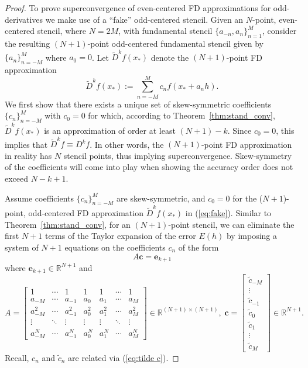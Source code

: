 \documentclass[10pt,a4paper]{amsart}
\newcommand{\FD}{D}
\newcommand{\xstar}{x_*}
\begin{document}
\begin{proof}  
To prove superconvergence of even-centered FD approximations for odd-derivatives we make use of a ``fake'' odd-centered stencil.
Given an $N$-point, even-centered stencil, where $N=2M$, with fundamental stencil $\{a_{-n},a_n\}_{n=1}^M$, consider the resulting $(N+1)$-point odd-centered fundamental stencil given by $\{a_n\}_{n=-M}^M$ where $a_0=0$.
Let $\tilde \FD^k f(\xstar)$ denote the $(N+1)$-point FD approximation
\begin{equation}\label{eq:fake}
	\tilde\FD^k f(\xstar) := \sum_{n=-M}^M c_nf(\xstar+a_nh).
\end{equation}
We first show that there exists a unique set of skew-symmetric coefficients $\{c_n\}_{n=-M}^M$ with $c_0=0$ for which, according to Theorem~\ref{thm:stand_conv}, $\tilde\FD^k f(\xstar)$ is an approximation of order at least $(N+1)-k$.
Since $c_0=0$, this implies that $\tilde \FD^k f\equiv D^kf$.
In other words, the $(N+1)$-point FD approximation in reality has $N$ stencil points, thus implying superconvergence.
Skew-symmetry of the coefficients will come into play when showing the accuracy order does not exceed $N-k+1$.

Assume coefficients $\{c_n\}_{n=-M}^M$ are skew-symmetric, and $c_0=0$ for the ($N+1$)-point, odd-centered FD approximation $\tilde\FD^kf(\xstar)$ in (\ref{eq:fake}).
Similar to Theorem~\ref{thm:stand_conv}, for an $(N+1)$-point stencil, we can eliminate the first $N+1$ terms of the Taylor expansion of the error $E(h)$ by imposing a system of $N+1$ equations on the coefficients $c_n$ of the form
\begin{equation}\label{eq:big}
	A\mathbf c = \mathbf e_{k+1}
\end{equation}
where $\mathbf e_{k+1}\in \mathbb R^{N+1}$ and
\begin{equation}\label{eq:MatAOE}
	A =
	\begin{bmatrix}
		1 &\cdots & 1 &1 & 1 & \cdots & 1\\
		a_{-M}& \cdots& a_{-1}& a_0 & a_1 & \cdots & a_M\\
		a_{-M}^2& \cdots& a_{-1}^2& a_0^2 & a_1^2 & \cdots & a_M^2\\
		\vdots & \ddots & \vdots & \vdots & \vdots & \ddots & \vdots\\
		a_{-M}^{N}&\cdots & a_{-1}^{N}& a_0^N & a_1^{N} & \cdots & a_M^{N}
	\end{bmatrix}\in\mathbb R^{(N+1)\times (N+1)}, \;
	\mathbf c = \begin{bmatrix}
		\tilde c_{-M}\\  \vdots \\ \tilde c_{-1}\\ \tilde c_0\\ \tilde c_1\\ \vdots \\ \tilde c_{M}
	\end{bmatrix}\in\mathbb R^{N+1}.
\end{equation}
Recall, $c_n$ and $\tilde c_n$ are related via (\ref{eq:tilde c}).


\end{proof}
\end{document}
